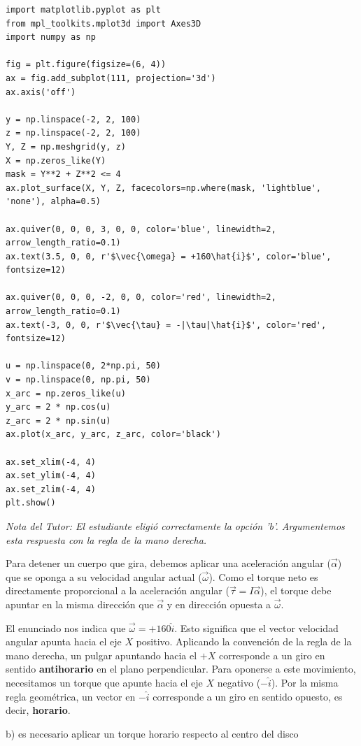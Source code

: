 \documentclass[12pt, a4paper]{article}
\begin{document}
\begin{verbatim}
import matplotlib.pyplot as plt
from mpl_toolkits.mplot3d import Axes3D
import numpy as np

fig = plt.figure(figsize=(6, 4))
ax = fig.add_subplot(111, projection='3d')
ax.axis('off')

y = np.linspace(-2, 2, 100)
z = np.linspace(-2, 2, 100)
Y, Z = np.meshgrid(y, z)
X = np.zeros_like(Y)
mask = Y**2 + Z**2 <= 4
ax.plot_surface(X, Y, Z, facecolors=np.where(mask, 'lightblue', 'none'), alpha=0.5)

ax.quiver(0, 0, 0, 3, 0, 0, color='blue', linewidth=2, arrow_length_ratio=0.1)
ax.text(3.5, 0, 0, r'$\vec{\omega} = +160\hat{i}$', color='blue', fontsize=12)

ax.quiver(0, 0, 0, -2, 0, 0, color='red', linewidth=2, arrow_length_ratio=0.1)
ax.text(-3, 0, 0, r'$\vec{\tau} = -|\tau|\hat{i}$', color='red', fontsize=12)

u = np.linspace(0, 2*np.pi, 50)
v = np.linspace(0, np.pi, 50)
x_arc = np.zeros_like(u)
y_arc = 2 * np.cos(u)
z_arc = 2 * np.sin(u)
ax.plot(x_arc, y_arc, z_arc, color='black')

ax.set_xlim(-4, 4)
ax.set_ylim(-4, 4)
ax.set_zlim(-4, 4)
plt.show()
\end{verbatim}

\textit{Nota del Tutor: El estudiante eligió correctamente la opción 'b'. Argumentemos esta respuesta con la regla de la mano derecha.}

Para detener un cuerpo que gira, debemos aplicar una aceleración angular ($\vec{\alpha}$) que se oponga a su velocidad angular actual ($\vec{\omega}$). Como el torque neto es directamente proporcional a la aceleración angular ($\vec{\tau} = I\vec{\alpha}$), el torque debe apuntar en la misma dirección que $\vec{\alpha}$ y en dirección opuesta a $\vec{\omega}$.

El enunciado nos indica que $\vec{\omega} = +160\hat{i}$. Esto significa que el vector velocidad angular apunta hacia el eje $X$ positivo. Aplicando la convención de la regla de la mano derecha, un pulgar apuntando hacia el $+X$ corresponde a un giro en sentido \textbf{antihorario} en el plano perpendicular.
Para oponerse a este movimiento, necesitamos un torque que apunte hacia el eje $X$ negativo ($-\hat{i}$). Por la misma regla geométrica, un vector en $-\hat{i}$ corresponde a un giro en sentido opuesto, es decir, \textbf{horario}.

\begin{tcolorbox}[colback=green!5!white, colframe=green!50!black, title=Respuesta Final]
\centering \Large b) es necesario aplicar un torque horario respecto al centro del disco
\end{tcolorbox}
\end{document}
